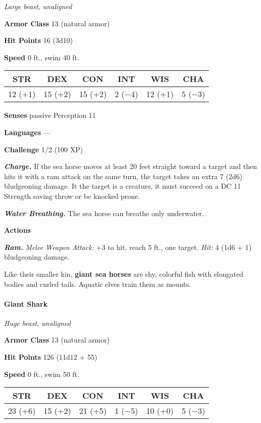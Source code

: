 \documentclass[
]{article}
\begin{document}
\emph{Large beast, unaligned}

\textbf{Armor Class} 13 (natural armor)

\textbf{Hit Points} 16 (3d10)

\textbf{Speed} 0 ft., swim 40 ft.

\begin{longtable}[]{@{}cccccc@{}}
\toprule
STR & DEX & CON & INT & WIS & CHA\tabularnewline
\midrule
\endhead
12 (+1) & 15 (+2) & 15 (+2) & 2 (−4) & 12 (+1) & 5 (−3)\tabularnewline
\bottomrule
\end{longtable}

\textbf{Senses} passive Perception 11

\textbf{Languages} ---

\textbf{Challenge} 1/2 (100 XP)

\emph{\textbf{Charge.}} If the sea horse moves at least 20 feet straight
toward a target and then hits it with a ram attack on the same turn, the
target takes an extra 7 (2d6) bludgeoning damage. It the target is a
creature, it must succeed on a DC 11 Strength saving throw or be knocked
prone.

\emph{\textbf{Water Breathing.}} The sea horse can breathe only
underwater.

\textbf{Actions}

\emph{\textbf{Ram.}} \emph{Melee Weapon Attack:} +3 to hit, reach 5 ft.,
one target. \emph{Hit:} 4 (1d6 + 1) bludgeoning damage.

Like their smaller kin, \textbf{giant sea horses} are shy, colorful fish
with elongated bodies and curled tails. Aquatic elves train them as
mounts.

\hypertarget{giant-shark}{%
\paragraph{Giant Shark}\label{giant-shark}}

\emph{Huge beast, unaligned}

\textbf{Armor Class} 13 (natural armor)

\textbf{Hit Points} 126 (11d12 + 55)

\textbf{Speed} 0 ft., swim 50 ft.

\begin{longtable}[]{@{}cccccc@{}}
\toprule
STR & DEX & CON & INT & WIS & CHA\tabularnewline
\midrule
\endhead
23 (+6) & 15 (+2) & 21 (+5) & 1 (−5) & 10 (+0) & 5 (−3)\tabularnewline
\bottomrule
\end{longtable}
\end{document}
